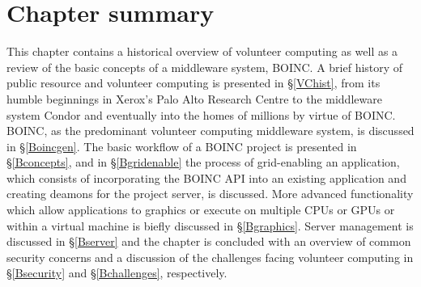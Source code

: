 \section{Chapter summary}
This chapter contains a historical overview of volunteer computing as well as a review of the basic concepts of  a middleware system, BOINC. A brief history of public resource and volunteer computing is presented in \S\ref{VChist}, from its humble beginnings in Xerox's Palo Alto Research Centre to the middleware system Condor and eventually into the homes of millions by virtue of BOINC. BOINC, as the predominant volunteer computing middleware system,  is discussed in \S\ref{Boincgen}. The basic workflow of a BOINC project is presented in \S\ref{Bconcepts}, and in \S\ref{Bgridenable} the process of grid-enabling an application, which consists of incorporating the BOINC API into an existing application and creating deamons for the project server, is discussed. More advanced functionality which allow applications to graphics or execute on multiple CPUs or GPUs or within a virtual machine is biefly discussed in \S\ref{Bgraphics}. Server management is discussed in \S\ref{Bserver} and the chapter is concluded with an overview of  common security concerns and a discussion of the challenges facing volunteer computing in \S\ref{Bsecurity} and \S\ref{Bchallenges}, respectively.